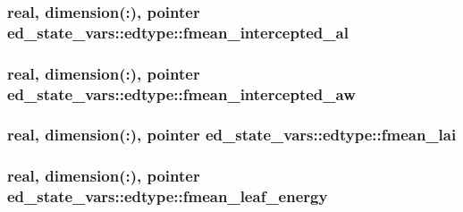 \subsubsection[{\texorpdfstring{fmean\+\_\+intercepted\+\_\+al}{fmean_intercepted_al}}]{\setlength{\rightskip}{0pt plus 5cm}real, dimension(\+:), pointer ed\+\_\+state\+\_\+vars\+::edtype\+::fmean\+\_\+intercepted\+\_\+al}\hypertarget{structed__state__vars_1_1edtype_ae1f8219c1b255468e90a238084f37066}{}\label{structed__state__vars_1_1edtype_ae1f8219c1b255468e90a238084f37066}
\subsubsection[{\texorpdfstring{fmean\+\_\+intercepted\+\_\+aw}{fmean_intercepted_aw}}]{\setlength{\rightskip}{0pt plus 5cm}real, dimension(\+:), pointer ed\+\_\+state\+\_\+vars\+::edtype\+::fmean\+\_\+intercepted\+\_\+aw}\hypertarget{structed__state__vars_1_1edtype_ac0e3b9b703450dabc1d9b9e8ac7efc7c}{}\label{structed__state__vars_1_1edtype_ac0e3b9b703450dabc1d9b9e8ac7efc7c}
\subsubsection[{\texorpdfstring{fmean\+\_\+lai}{fmean_lai}}]{\setlength{\rightskip}{0pt plus 5cm}real, dimension(\+:), pointer ed\+\_\+state\+\_\+vars\+::edtype\+::fmean\+\_\+lai}\hypertarget{structed__state__vars_1_1edtype_ae30f7d13b819ab27be615758c27a5963}{}\label{structed__state__vars_1_1edtype_ae30f7d13b819ab27be615758c27a5963}
\subsubsection[{\texorpdfstring{fmean\+\_\+leaf\+\_\+energy}{fmean_leaf_energy}}]{\setlength{\rightskip}{0pt plus 5cm}real, dimension(\+:), pointer ed\+\_\+state\+\_\+vars\+::edtype\+::fmean\+\_\+leaf\+\_\+energy}\hypertarget{structed__state__vars_1_1edtype_a86d023e0719e25759958624fc4deab6a}{}\label{structed__state__vars_1_1edtype_a86d023e0719e25759958624fc4deab6a}
